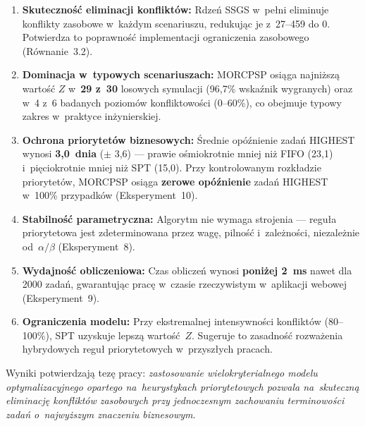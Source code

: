\begin{enumerate}
    \item \textbf{Skuteczność eliminacji konfliktów:} Rdzeń SSGS w~pełni eliminuje konflikty zasobowe w~każdym scenariuszu, redukując je z~27--459 do 0. Potwierdza to poprawność implementacji ograniczenia zasobowego (Równanie~3.2).

    \item \textbf{Dominacja w~typowych scenariuszach:} MORCPSP osiąga najniższą wartość $Z$ w~\textbf{29 z~30} losowych symulacji (96{,}7\% wskaźnik wygranych) oraz w~4 z~6 badanych poziomów konfliktowości (0--60\%), co obejmuje typowy zakres w~praktyce inżynierskiej.

    \item \textbf{Ochrona priorytetów biznesowych:} Średnie opóźnienie zadań HIGHEST wynosi \textbf{3{,}0~dnia} ($\pm$ 3{,}6) --- prawie ośmiokrotnie mniej niż FIFO (23{,}1) i~pięciokrotnie mniej niż SPT (15{,}0). Przy kontrolowanym rozkładzie priorytetów, MORCPSP osiąga \textbf{zerowe opóźnienie} zadań HIGHEST w~100\% przypadków (Eksperyment~10).

    \item \textbf{Stabilność parametryczna:} Algorytm nie wymaga strojenia --- reguła priorytetowa jest zdeterminowana przez wagę, pilność i~zależności, niezależnie od~$\alpha/\beta$ (Eksperyment~8).

    \item \textbf{Wydajność obliczeniowa:} Czas obliczeń wynosi \textbf{poniżej 2~ms} nawet dla 2000 zadań, gwarantując pracę w~czasie rzeczywistym w~aplikacji webowej (Eksperyment~9).

    \item \textbf{Ograniczenia modelu:} Przy ekstremalnej intensywności konfliktów (80--100\%), SPT uzyskuje lepszą wartość~$Z$. Sugeruje to zasadność rozważenia hybrydowych reguł priorytetowych w~przyszłych pracach.
\end{enumerate}

\noindent Wyniki potwierdzają tezę pracy: \textit{zastosowanie wielokryterialnego modelu optymalizacyjnego opartego na~heurystykach priorytetowych pozwala na~skuteczną eliminację konfliktów zasobowych przy jednoczesnym zachowaniu terminowości zadań o~najwyższym znaczeniu biznesowym}.

